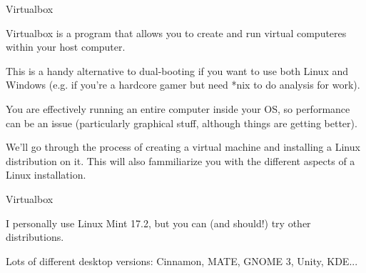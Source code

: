 \documentclass[10pt]{beamer}
\begin{document}
\begin{frame}[fragile]{Virtualbox}

  Virtualbox is a program that allows you to create and run virtual computeres within your host computer.

  This is a handy alternative to dual-booting if you want to use both Linux and Windows (e.g. if you're a hardcore gamer but need *nix to do analysis for work).

  You are effectively running an entire computer inside your OS, so performance can be an issue (particularly graphical stuff, although things are getting better).

  We'll go through the process of creating a virtual machine and installing a Linux distribution on it. This will also fammiliarize you with the different aspects of a Linux installation.
\end{frame}

\begin{frame}[fragile]{Virtualbox}

  I personally use Linux Mint 17.2, but you can (and should!) try other distributions.

  Lots of different desktop versions: Cinnamon, MATE, GNOME 3, Unity, KDE...  
  
\end{frame}
\end{document}
